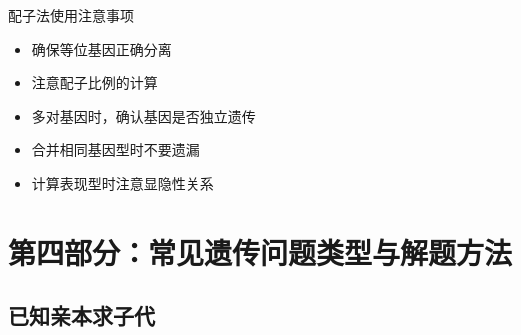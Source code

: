 \documentclass[a4paper,11pt]{ctexart}
\begin{document}
\begin{notebox}{配子法使用注意事项}
\begin{itemize}[leftmargin=2em]
    \item 确保等位基因正确分离
    \item 注意配子比例的计算
    \item 多对基因时，确认基因是否独立遗传
    \item 合并相同基因型时不要遗漏
    \item 计算表现型时注意显隐性关系
\end{itemize}
\end{notebox}


\section{第四部分：常见遗传问题类型与解题方法}

\subsection{已知亲本求子代}
\end{document}
